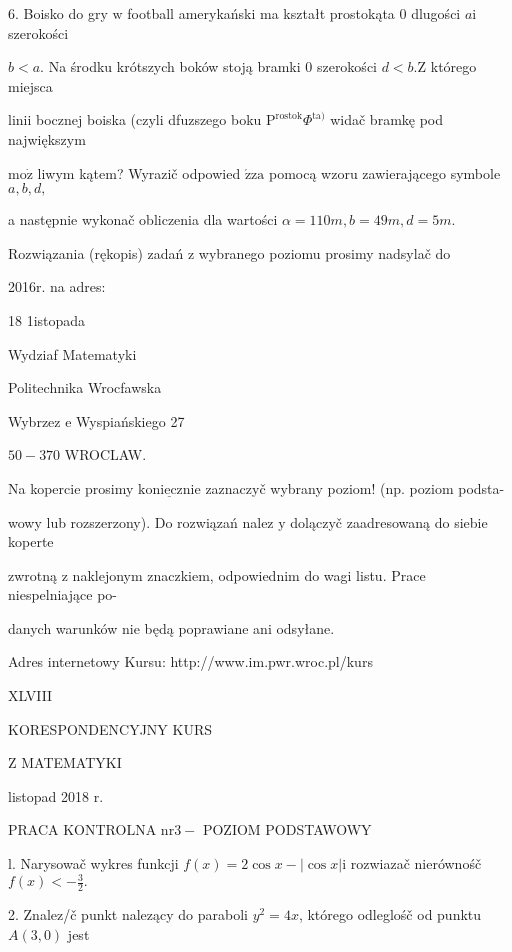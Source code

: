 \documentclass[a4paper,12pt]{article}
\begin{document}
6. Boisko do gry $\mathrm{w}$ football amerykański ma kształt prostokąta $0$ dlugości $a\mathrm{i}$ szerokości

$b<a$. Na środku krótszych boków stoją bramki $0$ szerokości $d<b. \mathrm{Z}$ którego miejsca

linii bocznej boiska (czyli dfuzszego boku $\mathrm{P}^{\mathrm{r}\mathrm{o}\mathrm{s}\mathrm{t}\mathrm{o}\mathrm{k}}\Phi^{\mathrm{t}\mathrm{a})}$ widač bramkę pod największym

$\mathrm{m}\mathrm{o}\dot{\mathrm{z}}$ liwym kątem? Wyrazič odpowied $\acute{\mathrm{z}}\mathrm{z}\mathrm{a}$ pomocą wzoru zawierającego symbole $a, b, d,$

a następnie wykonač obliczenia dla wartości $\alpha=110m, b=49m, d=5m.$

Rozwiązania (rękopis) zadań z wybranego poziomu prosimy nadsylač do

2016r. na adres:

18 1istopada

Wydziaf Matematyki

Politechnika Wrocfawska

Wybrzez $\mathrm{e}$ Wyspiańskiego 27

$50-370$ WROCLAW.

Na kopercie prosimy $\underline{\mathrm{k}\mathrm{o}\mathrm{n}\mathrm{i}\mathrm{e}\mathrm{c}\mathrm{z}\mathrm{n}\mathrm{i}\mathrm{e}}$ zaznaczyč wybrany poziom! (np. poziom podsta-

wowy lub rozszerzony). Do rozwiązań nalez $\mathrm{y}$ dolączyč zaadresowaną do siebie koperte

zwrotną $\mathrm{z}$ naklejonym znaczkiem, odpowiednim do wagi listu. Prace niespelniające po-

danych warunków nie będą poprawiane ani odsyłane.

Adres internetowy Kursu: http://www.im.pwr.wroc.pl/kurs







XLVIII

KORESPONDENCYJNY KURS

Z MATEMATYKI

listopad 2018 r.

PRACA KONTROLNA $\mathrm{n}\mathrm{r} 3-$ POZIOM PODSTAWOWY

l. Narysowač wykres funkcji $f(x)=2\cos x-|\cos x|\mathrm{i}$ rozwiazač nierównośč $f(x)<-\displaystyle \frac{3}{2}.$

2. Znalez/č punkt nalezący do paraboli $y^{2}=4x$, którego odleglośč od punktu $A(3,0)$ jest
\end{document}
